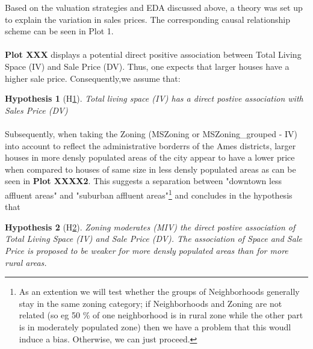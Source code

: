 \documentclass{article}
\newtheorem{hyp}{Hypothesis}
\begin{document}
\indent Based on the valuation strategies and EDA discussed above, a theory was set up to explain the variation in sales prices. The corresponding causal relationship scheme can be seen in Plot 1. 

\indent \paragraph{} \textbf{Plot XXX} displays a potential direct positive association between Total Living Space (IV) and Sale Price (DV). Thus, one expects that larger houses have a higher sale price. Consequently,we assume that:

\begin{hyp}[H\ref{hyp:first}] \label{hyp:first}
Total living space (IV) has a direct postive association with Sales Price (DV)
\end{hyp}

\begin{center}
\end{center}


\indent \paragraph{} Subsequently, when taking the Zoning (MSZoning or MSZoning\_grouped - IV) into account to reflect the administrative borderrs of the Ames districts, larger houses in more densly populated areas of the city appear to have a lower price when compared to houses of same size in less densly populated areas as can be seen in \textbf{Plot XXXX2}. This suggests a separation between "downtown less affluent areas" and "suburban affluent areas"\footnote{As an extention\: we will test whether the groups of Neighborhoods generally stay in the same zoning category; if Neighborhoods and Zoning are not related (so eg 50 \% of one neighborhood is in rural zone while the other part is in moderately populated zone) then we have a problem that this woudl induce a bias. Otherwise, we can just proceed.} and concludes in the hypothesis that

\begin{hyp}[H\ref{hyp:second}] \label{hyp:second}
Zoning moderates (MIV) the direct postive association of Total Living Space (IV) and Sale Price (DV). The association of Space and Sale Price is proposed to be weaker for more densly populated areas than for more rural areas. 
\end{hyp}
\end{document}
